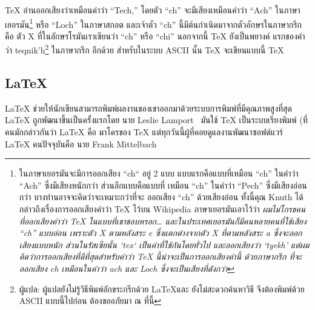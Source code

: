 \TeX{} อ่านออกเสียงว่าเหมือนคำว่า ``Tech,'' โดยตัว ``ch'' จะมีเสียงเหมือนคำว่า
``Ach'' ในภาษาเยอรมัน\footnote{ในภาษาเยอรมันจะมีการออกเสียง ``ch`` อยู่ 2 แบบ
แบบแรกคือแบบที่เหมือน ``ch'' ในคำว่า ``Ach'' ซึ่งมีเสียงหนักกว่า ส่วนอีกแบบคือแบบที่%
เหมือน ``ch'' ในคำว่า ``Pech'' ซึ่งมีเสียงอ่อนกว่า บางท่านอาจจะคิดว่าจะเหมาะกว่าที่จะ%
ออกเสียง ``ch'' ด้วยเสียงอ่อน ทั้งนี้คุณ Knuth ได้กล่าวถึงเรื่องการออกเสียงคำว่า \TeX{}
ไว้บน Wikipedia ภาษาเยอรมันเอาไว้ว่า \emph{ผมไม่โกรธคนที่ออกเสียงคำว่า \TeX{}
ในแบบที่เขาชอบหรอก\ldots{} และในประเทศเยอรมันก็มีคนหลายคนที่ใช้เสียง ``ch''
แบบอ่อน เพราะตัว X ตามหลังสระ e ซึ่งแตกต่างจากตัว X ที่ตามหลังสระ a
ซึ่งจะออกเสียงแบบหนัก ส่วนในรัสเซียนั้น `tex` เป็นคำที่ใช้กันโดยทั่วไป และออกเสียงว่า
`tyekh' แต่ผมคิดว่าการออกเสียงที่ดีที่สุดสำหรับคำว่า \TeX{} นี้น่าจะเป็นการออกเสียงคำนี้%
ด้วยภาษากรีก ที่จะออกเสียง ch เหมือนในคำว่า ach และ Loch ซึ่งจะเป็นเสียงที่ดังกว่า}}
หรือ ``Loch'' ในภาษาสกอต และเจ้าตัว ``ch'' นี้มีต้นกำเนิดมาจากตัวอักษรในภาษากรีก คือ
ตัว X ที่ในอักษรโรมันเราเขียนว่า ``ch'' หรือ ``chi'' นอกจากนี้ \TeX{} ยังเป็นพยางค์%
แรกของคำว่า teqnik'h\footnote{ผู้แปล: ผู้แปลยังไม่รู้วิธีพิมพ์อักขระกรีกด้วย \LaTeX และ
ยังไม่สะดวกค้นหาวิธี จึงต้องพิมพ์ด้วย ASCII แบบนี้ไปก่อน ต้องขออภัยมา ณ ที่นี้} ในภาษากรีก%
อีกด้วย สำหรับในระบบ ASCII นั้น \TeX{} จะเขียนแบบนี้ TeX

\subsection{\LaTeX}

\LaTeX{} ช่วยให้นักเขียนสามารถพิมพ์ผลงานของเขาออกมาด้วยระบบการพิมพ์ที่มีคุณภาพสูงที่สุด
\LaTeX{} ถูกพัฒนาขึ้นเป็นครั้งแรกโดย นาย Leslie
Lamport~\cite{manual}  มันใช้ \TeX{} เป็นระบบเรียงพิมพ์ (ที่คนมักกล่าวกันว่า
\LaTeX{} คือ มาโครของ \TeX{} แต่ทุกวันนี้ผู้ที่คอยดูแลงานพัฒนาซอฟต์แวร์ \LaTeX{}
คนปัจจุบันคือ นาย Frank Mittelbach

\shbtoaddmoretranslation

